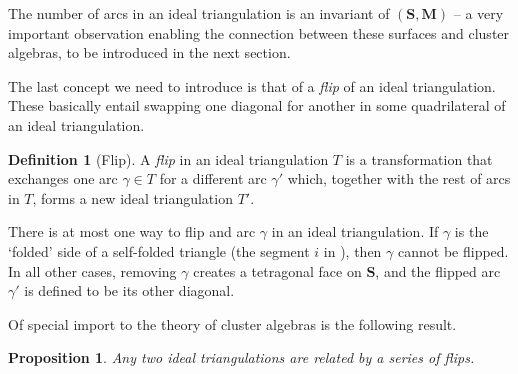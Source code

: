 \documentclass[a4paper,oneside,svgnames]{amsart}
\theoremstyle{plain}
\newtheorem{proposition}[theorem]{Proposition}
\theoremstyle{definition}
\newtheorem{definition}[theorem]{Definition}
\begin{document}
 The number of arcs in an ideal triangulation is an invariant of
 $(\mathbf{S},\mathbf{M})$ -- a very important observation enabling the
 connection between these surfaces and cluster algebras, to be introduced in the
 next section.

 The last concept we need to introduce is that of a \emph{flip} of an ideal
 triangulation. These basically entail swapping one diagonal for another in some
 quadrilateral of an ideal triangulation.

 \begin{definition}[Flip]
  \label{def:flip}
  A \emph{flip} in an ideal triangulation $T$ is a transformation that
  exchanges one arc $\gamma \in T$ for a different arc $\gamma'$ which, together
  with the rest of arcs in $T$, forms a new ideal triangulation $T'$.
 \end{definition}

 There is at most one way to flip and arc $\gamma$ in an ideal triangulation. If
 $\gamma$ is the `folded' side of a self-folded triangle (the segment $i$ in
 ), then $\gamma$ cannot be flipped. In all other
 cases, removing $\gamma$ creates a tetragonal face on $\mathbf{S}$, and the
 flipped arc $\gamma'$ is defined to be its other diagonal.

 Of special import to the theory of cluster algebras is the following result.

 \begin{proposition}
  Any two ideal triangulations are related by a series of flips.
 \end{proposition}
\end{document}
